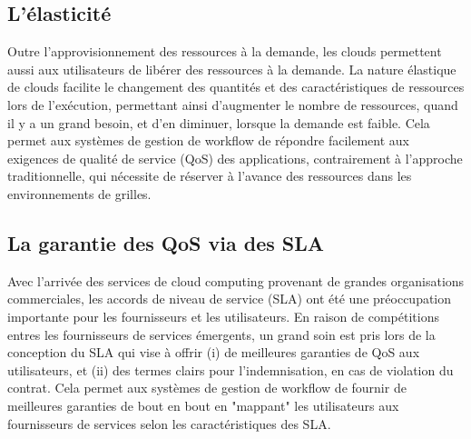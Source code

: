 \subsection{L’élasticité}
Outre l’approvisionnement des ressources à la demande, les clouds permettent aussi aux utilisateurs de libérer des ressources à la demande. La nature élastique de clouds facilite le changement des quantités et des caractéristiques de ressources lors de l'exécution, permettant ainsi d’augmenter le nombre de ressources, quand il y a un grand besoin, et d’en diminuer, lorsque la demande est faible. Cela permet aux systèmes de gestion de workflow de répondre facilement aux exigences de qualité de service (QoS) des applications, contrairement à l'approche traditionnelle, qui nécessite de réserver à l'avance des ressources dans les environnements de grilles. 
\subsection{La garantie des QoS via des SLA }
Avec l’arrivée des services de cloud computing  provenant de grandes organisations commerciales, les accords de niveau de service (SLA) ont été une préoccupation importante pour les fournisseurs et les utilisateurs. En raison de compétitions entres les fournisseurs de services émergents, un grand soin est pris lors de la conception du SLA qui vise à offrir (i) de meilleures garanties de QoS aux utilisateurs, et (ii) des termes clairs pour l'indemnisation, en cas de violation du contrat. Cela permet aux systèmes de gestion de workflow de fournir de meilleures garanties de bout en bout en "mappant" les utilisateurs aux fournisseurs de services selon les caractéristiques des SLA.

